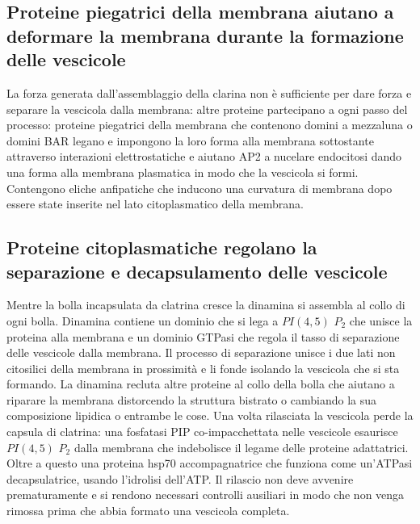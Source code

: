 \subsection{Proteine piegatrici della membrana aiutano a deformare la membrana durante la formazione delle vescicole}
La forza generata dall'assemblaggio della clarina non \`e sufficiente per dare forza e separare la vescicola dalla membrana: altre proteine partecipano a ogni passo del processo:
proteine piegatrici della membrana che contenono  domini a mezzaluna o domini BAR legano e impongono la loro forma alla membrana sottostante attraverso interazioni elettrostatiche e 
aiutano AP2 a nucelare endocitosi dando una forma alla membrana plasmatica in modo che la vescicola si formi. Contengono eliche anfipatiche che inducono una curvatura di membrana
dopo essere state inserite nel lato citoplasmatico della membrana.
\subsection{Proteine citoplasmatiche regolano la separazione e decapsulamento delle vescicole}
Mentre la bolla incapsulata da clatrina cresce la dinamina si assembla al collo di ogni bolla. Dinamina contiene un dominio che si lega a $PI(4,5)$ $P_2$ che unisce la proteina alla
membrana e un dominio GTPasi che regola il tasso di separazione delle vescicole dalla membrana. Il processo di separazione unisce i due lati non citosilici della membrana in prossimit\`a
e li fonde isolando la vescicola che si sta formando. La dinamina recluta altre proteine al collo della bolla che aiutano a riparare la membrana distorcendo la struttura bistrato o 
cambiando la sua composizione lipidica o entrambe le cose. Una volta rilasciata la vescicola perde la capsula di clatrina: una fosfatasi PIP co-impacchettata nelle vescicole esaurisce
$PI(4, 5)$ $P_2$ dalla membrana che indebolisce il legame delle proteine adattatrici. Oltre a questo una proteina hsp70 accompagnatrice che funziona come un'ATPasi decapsulatrice, usando
l'idrolisi dell'ATP. Il rilascio non deve avvenire prematuramente e si rendono necessari controlli ausiliari in modo che non venga rimossa prima che abbia formato una vescicola completa.
